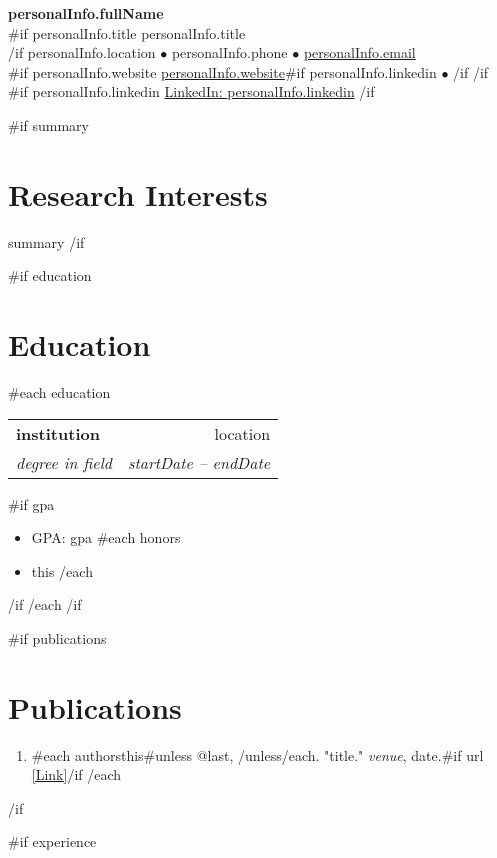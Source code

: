\documentclass[11pt,letterpaper]{article}
\makeatletter
\newcommand{\resitem}[1]{\item #1 \vspace{-2pt}}
\newcommand{\ressubheading}[4]{
\begin{tabular*}{7.0in}{l@{\extracolsep{\fill}}r}
		\textbf{#1} & #2 \\
		\textit{#3} & \textit{#4} \\
\end{tabular*}\vspace{-6pt}}
\makeatother
\begin{document}
\begin{center}
{\LARGE \textbf{{{personalInfo.fullName}}}}\\
\vspace{5pt}
{{#if personalInfo.title}}
{\large {{personalInfo.title}}}\\
\vspace{3pt}
{{/if}}
{{personalInfo.location}} $\bullet$ {{personalInfo.phone}} $\bullet$ \href{mailto:{{personalInfo.email}}}{{{personalInfo.email}}}\\
{{#if personalInfo.website}}
\href{{{personalInfo.website}}}{{{personalInfo.website}}}{{#if personalInfo.linkedin}} $\bullet$ {{/if}}
{{/if}}
{{#if personalInfo.linkedin}}
\href{https://linkedin.com/in/{{personalInfo.linkedin}}}{LinkedIn: {{personalInfo.linkedin}}}
{{/if}}
\end{center}

\vspace{10pt}

{{#if summary}}
\section{Research Interests}
{{summary}}
{{/if}}

{{#if education}}
\section{Education}
{{#each education}}
\ressubheading{{{institution}}}{{{location}}}{{{degree}} in {{field}}}{{{startDate}} -- {{endDate}}}
{{#if gpa}}
\begin{itemize}
\resitem{GPA: {{gpa}}}
{{#each honors}}
\resitem{{{this}}}
{{/each}}
\end{itemize}
{{/if}}
\vspace{5pt}
{{/each}}
{{/if}}

{{#if publications}}
\section{Publications}
\begin{enumerate}
{{#each publications}}
\item {{#each authors}}{{this}}{{#unless @last}}, {{/unless}}{{/each}}. "{{title}}." \textit{{{venue}}}, {{date}}.{{#if url}} \href{{{url}}}{[Link]}{{/if}}
{{/each}}
\end{enumerate}
{{/if}}

{{#if experience}}
\end{document}
